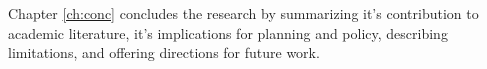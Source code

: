 Chapter \ref{ch:conc} concludes the research by summarizing it's contribution to academic literature, it's implications for planning and policy, describing limitations, and offering directions for future work. 












